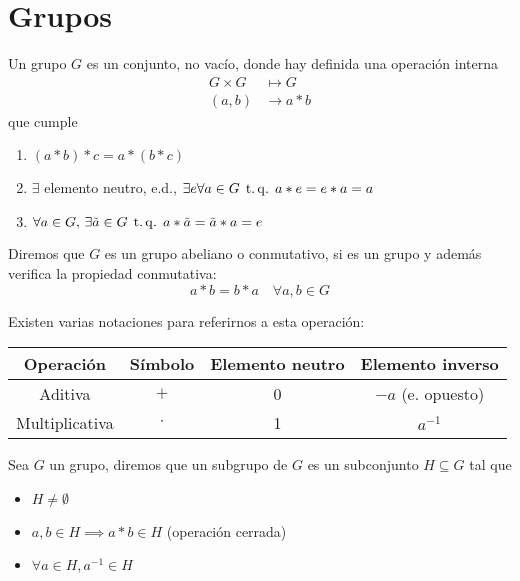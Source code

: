 \chapter{Grupos}

\begin{defi}[grupo]
    Un grupo $G$ es un conjunto, no vacío, donde hay definida una operación interna
    \[
        \begin{aligned}
            G \times G &\mapsto G \\
            (a, b) &\to a * b
        \end{aligned}
    \]
    que cumple
    \begin{enumerate}
        \item $(a*b)*c = a*(b*c)$
        \item $\exists$ elemento neutro, e.d., $\exists e \forall a \in G \operatorname{\;t.q.\;} a*e = e*a = a$
        \item $\forall a \in G, \, \exists \tilde{a} \in G \operatorname{\;t.q.\;} a * \tilde{a} = \tilde{a}*a = e$
    \end{enumerate}
\end{defi}

\begin{defi}
    Diremos que $G$ es un grupo abeliano o conmutativo, si es un grupo y además verifica la propiedad conmutativa:
    \[
        a*b = b*a \quad \forall a, b \in G
    \]
\end{defi}

\begin{obs}
    Existen varias notaciones para referirnos a esta operación:
    \begin{center}
        \begin{tabular}{|c|c|c|c|} \hline
            Operación & S\'imbolo & Elemento neutro & Elemento inverso \\ \hline \hline
            Aditiva & $+$ & 0 & $-a$ (e. opuesto) \\ \hline
            Multiplicativa & $\cdot$ & 1 & $a^{-1}$ \\ \hline
        \end{tabular}
    \end{center}
\end{obs}

\begin{defi}[subgrupo]
    Sea $G$ un grupo, diremos que un subgrupo de $G$ es un subconjunto $H \subseteq G$ tal que
    \begin{itemize}
        \item $H \neq \emptyset$
        \item $a, b \in H \implies a*b \in H$ (operación cerrada)
        \item $\forall a \in H, a^{-1} \in H$
    \end{itemize}
\end{defi}

